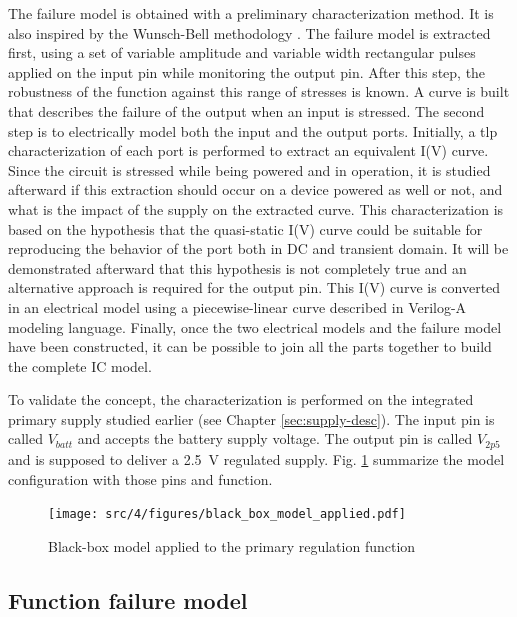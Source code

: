 The failure model is obtained with a preliminary characterization method.
It is also inspired by the Wunsch-Bell methodology \cite{wunsch-bell}.
The failure model is extracted first, using a set of variable amplitude and variable width rectangular pulses applied on the input pin while monitoring the output pin.
After this step, the robustness of the function against this range of stresses is known.
A curve is built that describes the failure of the output when an input is stressed.
The second step is to electrically model both the input and the output ports.
Initially, a \gls{tlp} characterization of each port is performed to extract an equivalent I(V) curve.
Since the circuit is stressed while being powered and in operation, it is studied afterward if this extraction should occur on a device powered as well or not, and what is the impact of the supply on the extracted curve.
This characterization is based on the hypothesis that the quasi-static I(V) curve could be suitable for reproducing the behavior of the port both in DC and transient domain.
It will be demonstrated afterward that this hypothesis is not completely true and an alternative approach is required for the output pin.
This I(V) curve is converted in an electrical model using a piecewise-linear curve described in Verilog-A modeling language.
Finally, once the two electrical models and the failure model have been constructed, it can be possible to join all the parts together to build the complete IC model.

To validate the concept, the characterization is performed on the integrated primary supply studied earlier (see Chapter \ref{sec:supply-desc}).
The input pin is called $V_{batt}$ and accepts the battery supply voltage.
The output pin is called $V_{2p5}$ and is supposed to deliver a \SI{2.5}{\volt} regulated supply.
Fig. \ref{fig:black-box-applied} summarize the model configuration with those pins and function.

\begin{figure}[!h]
  \centering
  \texttt{[image: src/4/figures/black\_box\_model\_applied.pdf]}
  \caption{Black-box model applied to the primary regulation function}
  \label{fig:black-box-applied}
\end{figure}


\subsection{Function failure model}

